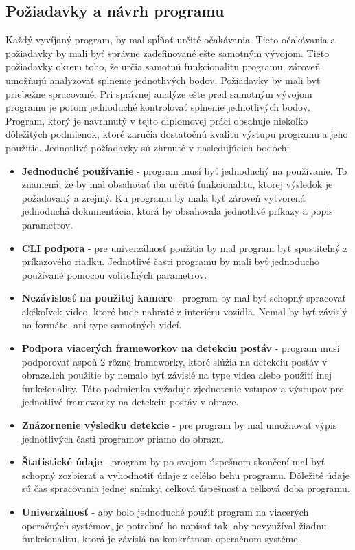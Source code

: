 \documentclass[slovak,master,dept460,male,cpp,cpdeclaration]{diploma}
\begin{document}
\newpage
\subsection{Požiadavky a návrh programu}
Každý vyvíjaný program, by mal  spĺňať určité očakávania. Tieto očakávania a požiadavky by mali byť správne zadefinované ešte samotným vývojom. Tieto požiadavky okrem toho, že určia samotnú funkcionalitu programu, zároveň umožňujú analyzovať splnenie jednotlivých bodov. Požiadavky by mali byť priebežne spracované. Pri správnej analýze ešte pred samotným vývojom programu je potom jednoduché kontrolovať splnenie jednotlivých bodov. Program, ktorý je navrhnutý v tejto diplomovej práci obsahuje niekoľko dôležitých podmienok, ktoré zaručia dostatočnú kvalitu výstupu programu a jeho použitie. Jednotlivé požiadavky sú zhrnuté v nasledujúcich bodoch:
\begin{itemize}
\item \textbf{Jednoduché používanie} - program  musí byť jednoduchý na používanie. To znamená, že by mal obsahovať  iba určitú funkcionalitu, ktorej výsledok je požadovaný a zrejmý. Ku programu by mala byť zároveň vytvorená jednoduchá dokumentácia, ktorá by obsahovala jednotlivé príkazy a popis parametrov.

\item \textbf{CLI podpora} - pre univerzálnosť použitia by mal program byť spustiteľný z príkazového riadku. Jednotlivé časti programu by mali byť jednoducho používané pomocou voliteľných parametrov.

\item \textbf{Nezávislosť na použitej kamere} - program by  mal byť schopný spracovať  akékoľvek video, ktoré bude nahraté z interiéru vozidla. Nemal by byť závislý na formáte, ani type samotných videí.

\item \textbf{Podpora  viacerých frameworkov na detekciu postáv} - program musí podporovať aspoň 2 rôzne frameworky, ktoré slúžia na detekciu postáv v obraze.Ich  použitie by nemalo byť závislé na type videa alebo použití inej funkcionality. Táto podmienka vyžaduje zjednotenie vstupov a výstupov pre jednotlivé frameworky na detekciu postáv v obraze.
\item \textbf{Znázornenie výsledku detekcie} - pre program by mal umožnovať výpis jednotlivých časti programov priamo do obrazu.
\item \textbf{Štatistické údaje} - program by po svojom úspešnom skončení mal byť schopný  zozbierať a vyhodnotiť údaje z celého behu programu. Dôležité údaje sú čas spracovania jednej snímky, celková úspešnosť a celková doba programu. 
\item \textbf{Univerzálnosť} -  aby bolo jednoduché použiť program na viacerých operačných systémov, je potrebné ho napísať tak, aby  nevyužíval žiadnu funkcionalitu, ktorá je závislá na konkrétnom operačnom systéme. 
\end{itemize}
\end{document}
